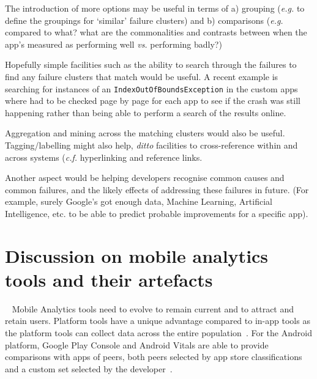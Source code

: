 The introduction of more options may be useful in terms of a) grouping (\emph{e.g.} to define the groupings for `similar' failure clusters) and b) comparisons (\emph{e.g.} compared to what? what are the commonalities and contrasts between when the app's measured as performing well \emph{vs.} performing badly?)

Hopefully simple facilities such as the ability to search through the failures to find any failure clusters that match would be useful. A recent example is searching for instances of an \texttt{IndexOutOfBoundsException} in the  custom apps where  had to be checked page by page for each app to see if the crash was still happening rather than being able to perform a search of the results online.

Aggregation and mining across the matching clusters would also be useful. Tagging/labelling might also help, \emph{ditto} facilities to cross-reference within and across systems (\emph{c.f.} hyperlinking and reference links.

Another aspect would be helping developers recognise common causes and common failures, and the likely effects of addressing these failures in future. (For example, surely Google's got enough data, Machine Learning, Artificial Intelligence, etc. to be able to predict probable improvements for a specific app).


\section[Discussion]{Discussion on mobile analytics tools and their artefacts}~\label{tata-discussion-section}
Mobile Analytics tools need to evolve to remain current and to attract and retain users. Platform tools have a unique advantage compared to in-app tools as the platform tools can collect data across the entire population~. For the Android platform, Google Play Console and Android Vitals are able to provide comparisons with apps of peers, both peers selected by app store classifications~ and a custom set selected by the developer~. 

